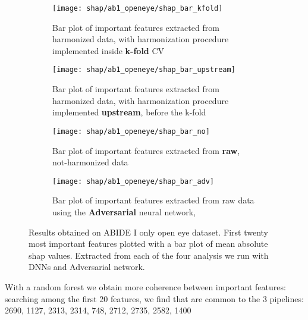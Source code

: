 \documentclass[11pt]{report}
\begin{document}
\begin{figure}[h!]
\centering
\begin{subfigure}[c]{.45\linewidth}
  \texttt{[image: shap/ab1\_openeye/shap\_bar\_kfold]}
   \caption{Bar plot of important features extracted from harmonized data, with harmonization procedure implemented inside \textbf{k-fold} CV}
    
\end{subfigure}
\begin{subfigure}[c]{.45\textwidth}
   \texttt{[image: shap/ab1\_openeye/shap\_bar\_upstream]}
   \caption{Bar plot of important features extracted from harmonized data, with harmonization procedure implemented \textbf{upstream}, before the k-fold}
    
\end{subfigure}
\hspace{3mm}
\begin{subfigure}[c]{.45\textwidth}
   \texttt{[image: shap/ab1\_openeye/shap\_bar\_no]}
   \caption{Bar plot of important features extracted from \textbf{raw}, not-harmonized data}
    
\end{subfigure}
\begin{subfigure}[c]{.45\textwidth}
   \texttt{[image: shap/ab1\_openeye/shap\_bar\_adv]}
   \caption{Bar plot of important features extracted from raw data using the \textbf{Adversarial} neural network,}
    
\end{subfigure}
\caption{Results obtained on ABIDE I only open eye dataset. First twenty most important features plotted with a bar plot of mean absolute shap values. Extracted from each of the four analysis we run with DNNs and Adversarial network. }
\label{fig:shap_abide_all_ab1}
\end{figure}





With a random forest we obtain more coherence between important features: searching among the first 20 features, we find that
are common to the 3 pipelines: 2690, 1127, 2313, 2314, 748, 2712, 2735, 2582, 1400
\end{document}
